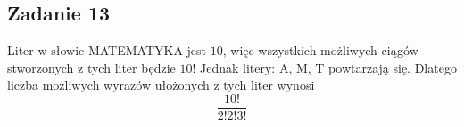 \subsection{Zadanie 13}

Liter w słowie MATEMATYKA jest $10$, więc wszystkich możliwych ciągów stworzonych z tych liter będzie $10!$
Jednak litery: A, M, T powtarzają się. Dlatego liczba możliwych wyrazów ułożonych z tych liter wynosi
$$
\frac{10!}{2!2!3!}
$$


